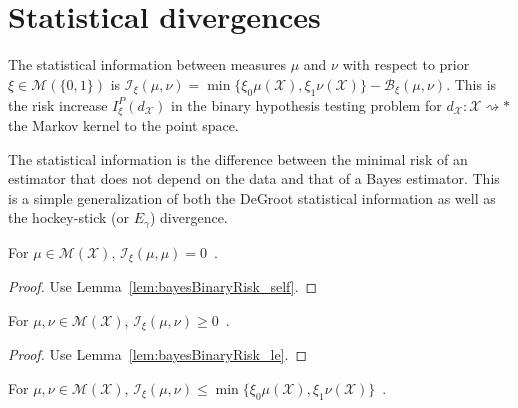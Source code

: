 
\section{Statistical divergences}

\begin{definition}
  \label{def:statInfo}
  \leanok
  The statistical information between measures $\mu$ and $\nu$ with respect to prior $\xi \in \mathcal M(\{0,1\})$ is
  $\mathcal I_\xi(\mu, \nu) = \min\{\xi_0 \mu(\mathcal X), \xi_1 \nu(\mathcal X)\} - \mathcal B_\xi(\mu, \nu)$.
  This is the risk increase $I_\xi^P(d_{\mathcal X})$ in the binary hypothesis testing problem for $d_{\mathcal X} : \mathcal X \rightsquigarrow *$ the Markov kernel to the point space.
\end{definition}

The statistical information is the difference between the minimal risk of an estimator that does not depend on the data and that of a Bayes estimator.
This is a simple generalization of both the DeGroot statistical information as well as the hockey-stick (or $E_\gamma$) divergence.

\begin{lemma}
  \label{lem:statInfo_self}
  \leanok
  For $\mu \in \mathcal M(\mathcal X)$, $\mathcal I_\xi(\mu, \mu) = 0$~.
\end{lemma}

\begin{proof}\leanok
{}
Use Lemma~\ref{lem:bayesBinaryRisk_self}.
\end{proof}

\begin{lemma}
  \label{lem:statInfo_nonneg}
  For $\mu, \nu \in \mathcal M(\mathcal X)$, $\mathcal I_\xi(\mu, \nu) \ge 0$~.
\end{lemma}

\begin{proof}%
{}
Use Lemma~\ref{lem:bayesBinaryRisk_le}.
\end{proof}


\begin{lemma}
  \label{lem:statInfo_le}
  \leanok
  For $\mu, \nu \in \mathcal M(\mathcal X)$, $\mathcal I_\xi(\mu, \nu) \le \min\{\xi_0 \mu(\mathcal X), \xi_1 \nu(\mathcal X)\}$~.
\end{lemma}

